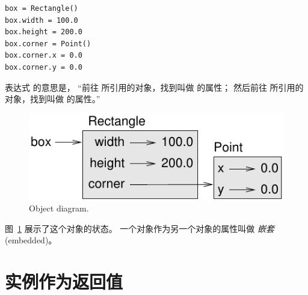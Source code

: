 \begin{lstlisting}
box = Rectangle()
box.width = 100.0
box.height = 200.0
box.corner = Point()
box.corner.x = 0.0
box.corner.y = 0.0
\end{lstlisting}

%

表达式  的意思是，
``前往  所引用的对象，找到叫做  的属性；
然后前往  所引用的对象，找到叫做  的属性。''

\begin{figure}
\centerline
{\includegraphics[scale=0.8]{../source/figs/rectangle.pdf}}
\caption{Object diagram.}
\label{fig.rectangle}
\end{figure}


图~\ref{fig.rectangle} 展示了这个对象的状态。
一个对象作为另一个对象的属性叫做 {\em 嵌套} (embedded)。
  
  
  


\section{实例作为返回值}
  


